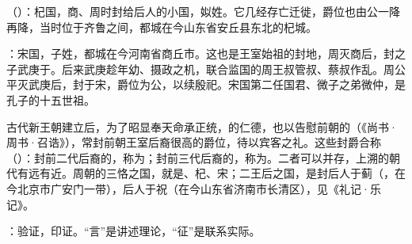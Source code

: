 {
\item {}（）：杞国，商、周时封给后人的小国，姒姓。它几经存亡迁徙，爵位也由公一降再降，当时位于齐鲁之间，都城在今山东省安丘县东北的杞城。

：宋国，子姓，都城在今河南省商丘市。这也是王室始祖的封地，周灭商后，封之子武庚于。后来武庚趁年幼、摄政之机，联合监国的周王叔管叔、蔡叔作乱。周公平灭武庚后，封于宋，爵位为公，以续殷祀。宋国第二任国君、微子之弟微仲，是孔子的十五世祖。

古代新王朝建立后，为了昭显奉天命承正统，的仁德，也以告慰前朝的（《尚书·周书·召诰》），常封前朝王室后裔很高的爵位，待以宾客之礼。这些封爵合称（）：封前二代后裔的，称为；封前三代后裔的，称为。二者可以并存，上溯的朝代有远有近。周朝的三恪之国，就是、杞、宋；二王后之国，是封后人于蓟（，在今北京市广安门一带），后人于祝（在今山东省济南市长清区），见《礼记·乐记》。

\item {}：验证，印证。“言”是讲述理论，“征”是联系实际。
}
{}  %


